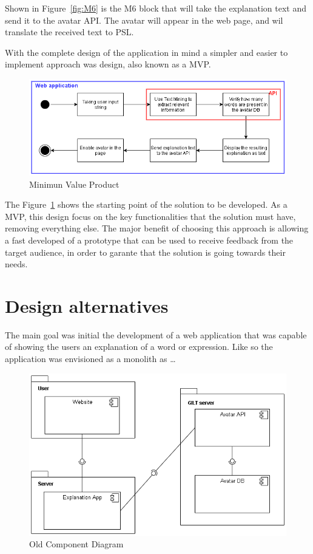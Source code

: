 Shown in Figure~\ref{fig:M6} is the M6 block that will take the explanation text and send it to the avatar \gls{API}.
The avatar will appear in the web page, and wil translate the received text to \gls{PSL}.

With the complete design of the application in mind a simpler and easier to implement approach was design, also known as a \gls{MVP}.

\begin{figure}[H]
\centering
\includegraphics[scale=0.5]{ch4/assets/mvp_2.png}
\caption[Minimun Value Product]{Minimun Value Product}
\label{fig:mvp}
\end{figure}

The Figure~\ref{fig:mvp} shows the starting point of the solution to be developed.
As a \gls{MVP}, this design focus on the key functionalities that the solution must have, removing everything else.
The major benefit of choosing this approach is allowing a fast developed of a prototype that can be used to receive feedback from the target audience, in order to garante that the solution is going towards their needs. 

\section{Design alternatives}

The main goal was initial the development of a web application that was capable of showing the users an explanation of a word or expression.
Like so the application was envisioned as a monolith as \dots

\begin{figure}[H]
\centering
\includegraphics[scale=0.5]{ch4/assets/component_diagram_old.png}
\caption[Old Component Diagram]{Old Component Diagram}
\label{fig:ocd}
\end{figure}

